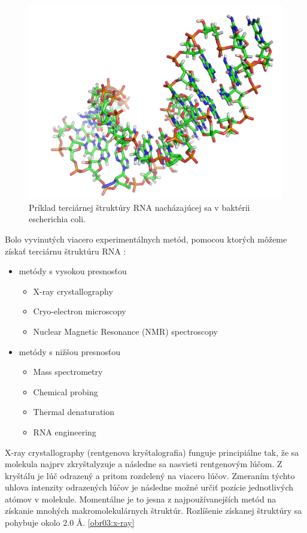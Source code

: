 \begin{figure}%
\includegraphics[width=\textwidth]{../img/ecoli_rna_example}
\caption{Príklad terciárnej štruktúry RNA nacházajúcej sa v baktérii  escherichia coli.}
\label{obr02:ecoli}
\end{figure}



\indent 
Bolo vyvinutých viacero experimentálnych metód, pomocou ktorých môžeme získať terciárnu štruktúru RNA \cite{Felden07}:
\begin{itemize}
\item metódy s vysokou presnosťou
\begin{itemize}
\item X-ray crystallography
\item Cryo-electron microscopy 
\item Nuclear Magnetic Resonance (NMR) spectroscopy
\end{itemize}
\item metódy s nižšou presnosťou
\begin{itemize}
\item Mass spectrometry
\item Chemical probing
\item Thermal denaturation
\item RNA engineering
\end{itemize}
\end{itemize}


\indent X-ray crystallography (rentgenova kryštalografia) funguje principiálne tak, že sa molekula najprv zkryštalyzuje a následne sa nasvieti rentgenovým lúčom. Z kryštálu je lúč odrazený a pritom rozdelený na viacero lúčov. Zmeraním týchto uhlova intenzity odrazených lúčov je následne možné určiť pozície jednotlivých atómov v molekule. Momentálne je to jesna z najpoužívanejších metód na získanie mnohých makromolekulárnych štruktúr. Rozlíšenie získanej štruktúry sa pohybuje okolo 2.0 Å. \ref{obr03:x-ray}


